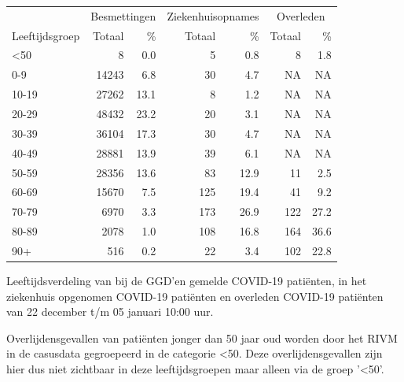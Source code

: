 \documentclass[
  english,
  man,floatsintext]{apa6}
\begin{document}
\begin{table}
\centering\begingroup\fontsize{11}{13}\selectfont

\begin{threeparttable}
\begin{tabular}{lrrrrrr}
\toprule
\multicolumn{1}{c}{ } & \multicolumn{2}{c}{Besmettingen} & \multicolumn{2}{c}{Ziekenhuisopnames} & \multicolumn{2}{c}{Overleden} \\
\cmidrule(l{3pt}r{3pt}){2-3} \cmidrule(l{3pt}r{3pt}){4-5} \cmidrule(l{3pt}r{3pt}){6-7}
Leeftijdsgroep & Totaal & \% & Totaal & \% & Totaal & \%\\
\midrule
<50 & 8 & 0.0 & 5 & 0.8 & 8 & 1.8\\
0-9 & 14243 & 6.8 & 30 & 4.7 & NA & NA\\
10-19 & 27262 & 13.1 & 8 & 1.2 & NA & NA\\
20-29 & 48432 & 23.2 & 20 & 3.1 & NA & NA\\
30-39 & 36104 & 17.3 & 30 & 4.7 & NA & NA\\
40-49 & 28881 & 13.9 & 39 & 6.1 & NA & NA\\
50-59 & 28356 & 13.6 & 83 & 12.9 & 11 & 2.5\\
60-69 & 15670 & 7.5 & 125 & 19.4 & 41 & 9.2\\
70-79 & 6970 & 3.3 & 173 & 26.9 & 122 & 27.2\\
80-89 & 2078 & 1.0 & 108 & 16.8 & 164 & 36.6\\
90+ & 516 & 0.2 & 22 & 3.4 & 102 & 22.8\\
\bottomrule
\end{tabular}
\begin{tablenotes}
\item[1] Leeftijdsverdeling van bij de GGD’en gemelde COVID-19 patiënten, in het ziekenhuis opgenomen COVID-19 patiënten en overleden COVID-19 patiënten van 22 december t/m 05 januari 10:00 uur.
\item[2] Overlijdensgevallen van patiënten jonger dan 50 jaar oud worden door het RIVM in de casusdata gegroepeerd in de categorie <50. Deze overlijdensgevallen zijn hier dus niet zichtbaar in deze leeftijdsgroepen maar alleen via de groep '<50'.
\end{tablenotes}
\end{threeparttable}
\endgroup{}
\end{table}

\newpage
\end{document}
